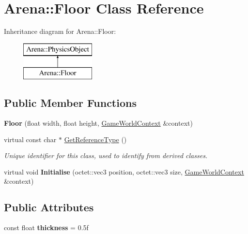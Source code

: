 \hypertarget{class_arena_1_1_floor}{\section{Arena\+:\+:Floor Class Reference}
\label{class_arena_1_1_floor}
}
Inheritance diagram for Arena\+:\+:Floor\+:\begin{figure}[H]
\begin{center}
\leavevmode
\includegraphics[height=2.000000cm]{class_arena_1_1_floor}
\end{center}
\end{figure}
\subsection*{Public Member Functions}
\begin{DoxyCompactItemize}
\item 
\hypertarget{class_arena_1_1_floor_aec378f5495f83305bc8c486c64bdb81b}{{\bfseries Floor} (float width, float height, \hyperlink{struct_arena_1_1_game_world_context}{Game\+World\+Context} \&context)}\label{class_arena_1_1_floor_aec378f5495f83305bc8c486c64bdb81b}

\item 
\hypertarget{class_arena_1_1_floor_a5269562a26498ba8fe4776cdac7244f2}{virtual const char $\ast$ \hyperlink{class_arena_1_1_floor_a5269562a26498ba8fe4776cdac7244f2}{Get\+Reference\+Type} ()}\label{class_arena_1_1_floor_a5269562a26498ba8fe4776cdac7244f2}

\begin{DoxyCompactList}\small\item\em Unique identifier for this class, used to identify from derived classes. \end{DoxyCompactList}\item 
\hypertarget{class_arena_1_1_floor_a76fe3f54c1b59b6af423f0460b4f8d81}{virtual void {\bfseries Initialise} (octet\+::vec3 position, octet\+::vec3 size, \hyperlink{struct_arena_1_1_game_world_context}{Game\+World\+Context} \&context)}\label{class_arena_1_1_floor_a76fe3f54c1b59b6af423f0460b4f8d81}

\end{DoxyCompactItemize}
\subsection*{Public Attributes}
\begin{DoxyCompactItemize}
\item 
\hypertarget{class_arena_1_1_floor_adc0e7b9fc001c5a91f27d132d55977ce}{const float {\bfseries thickness} = 0.\+5f}\label{class_arena_1_1_floor_adc0e7b9fc001c5a91f27d132d55977ce}

\end{DoxyCompactItemize}
